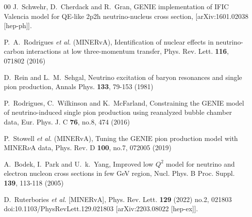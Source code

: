 \documentclass[aps,prl,twocolumn,superscriptaddress,nofootinbib]{revtex4-1}
\begin{document}
\begin{thebibliography}{00}
J.~Schwehr, D.~Cherdack and R.~Gran,
GENIE implementation of IFIC Valencia model for QE-like 2p2h neutrino-nucleus cross section,
[arXiv:1601.02038 [hep-ph]].

P.~A.~Rodrigues \textit{et al.} (MINERvA),
Identification of nuclear effects in neutrino-carbon interactions at low three-momentum transfer,
Phys. Rev. Lett. \textbf{116}, 071802 (2016)

D.~Rein and L.~M.~Sehgal,
Neutrino excitation of baryon resonances and single pion production,
Annals Phys. \textbf{133}, 79-153 (1981)

P.~Rodrigues, C.~Wilkinson and K.~McFarland,
Constraining the GENIE model of neutrino-induced single pion production using reanalyzed bubble chamber data,
Eur. Phys. J. C \textbf{76}, no.8, 474 (2016)

P.~Stowell \textit{et al.} (MINERvA),
Tuning the GENIE pion production model with MINER$\nu$A data,
Phys. Rev. D \textbf{100}, no.7, 072005 (2019)

A.~Bodek, I.~Park and U.~k.~Yang,
Improved low $Q^{2}$ model for neutrino and electron nucleon cross sections in few GeV region,
Nucl. Phys. B Proc. Suppl. \textbf{139}, 113-118 (2005)

D.~Ruterbories \textit{et al.} [MINERvA],
Phys. Rev. Lett. \textbf{129} (2022) no.2, 021803
doi:10.1103/PhysRevLett.129.021803
[arXiv:2203.08022 [hep-ex]].


\end{thebibliography}
\end{document}
